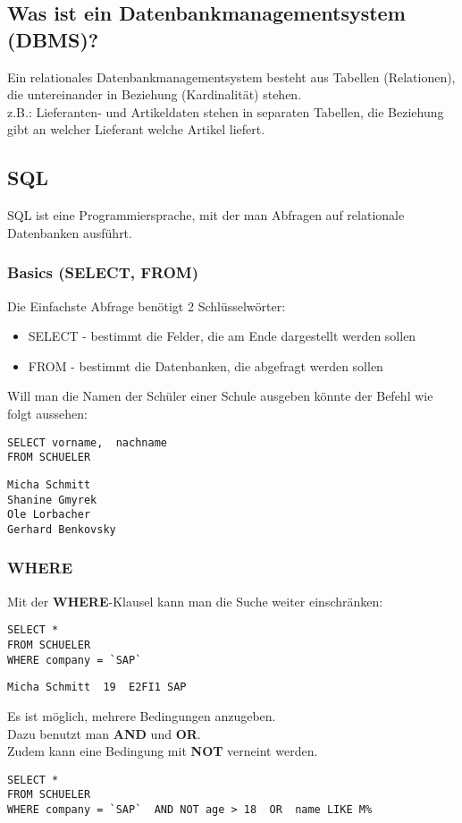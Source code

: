 \documentclass[asp1.tex]{subfiles}
\begin{document}
\subsection{Was ist ein Datenbankmanagementsystem (DBMS)?}
Ein relationales Datenbankmanagementsystem besteht aus Tabellen (Relationen), die untereinander in Beziehung (Kardinalität) stehen. \\
z.B.: Lieferanten- und Artikeldaten stehen in separaten Tabellen, die Beziehung gibt an welcher Lieferant welche Artikel liefert.

\subsection{SQL}

SQL ist eine Programmiersprache, mit der man Abfragen auf relationale Datenbanken ausführt.

\subsubsection{Basics (SELECT, FROM)}
Die Einfachste Abfrage benötigt 2 Schlüsselwörter:
\begin{itemize}
    \item SELECT - bestimmt die Felder, die am Ende dargestellt werden sollen
    \item FROM - bestimmt die Datenbanken, die abgefragt werden sollen \\
\end{itemize}
Will man die Namen der Schüler einer Schule ausgeben könnte der Befehl wie folgt aussehen:
\begin{lstlisting}
SELECT vorname,  nachname
FROM SCHUELER
\end{lstlisting}
\begin{verbatim}
Micha Schmitt
Shanine Gmyrek
Ole Lorbacher
Gerhard Benkovsky
\end{verbatim}

\subsubsection{WHERE}
Mit der \textbf{WHERE}-Klausel kann man die Suche weiter einschränken:
\begin{lstlisting}
SELECT *
FROM SCHUELER
WHERE company = `SAP`
\end{lstlisting}
\begin{verbatim}
Micha Schmitt  19  E2FI1 SAP
\end{verbatim}
Es ist möglich, mehrere Bedingungen anzugeben. \\
Dazu  benutzt man \textbf{AND} und \textbf{OR}.\\
Zudem kann eine Bedingung mit \textbf{NOT} verneint  werden.
\begin{lstlisting}
SELECT *
FROM SCHUELER
WHERE company = `SAP`  AND NOT age > 18  OR  name LIKE M%
\end{lstlisting}
\end{document}
